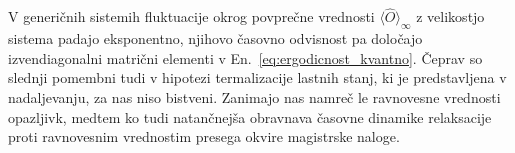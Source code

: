 \\\\
V generičnih sistemih fluktuacije okrog povprečne vrednosti $\langle\hat{O}\rangle_\infty$ z velikostjo sistema padajo eksponentno, njihovo časovno odvisnost pa določajo izvendiagonalni matrični elementi v En.~\eqref{eq:ergodicnost_kvantno}. Čeprav so slednji pomembni tudi v hipotezi termalizacije lastnih stanj, ki je predstavljena v nadaljevanju, za nas niso bistveni. Zanimajo nas namreč le ravnovesne vrednosti opazljivk, medtem ko tudi natančnejša obravnava časovne dinamike relaksacije proti ravnovesnim vrednostim presega okvire magistrske naloge. 
  




